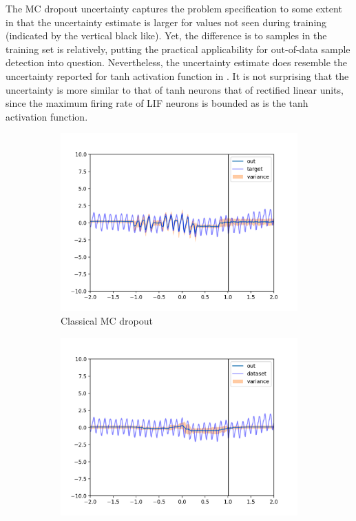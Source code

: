 \documentclass[10pt,a4paper,twocolumn]{article}
\begin{document}
The MC dropout uncertainty captures the problem specification to some extent in that the uncertainty estimate is larger for values not seen during training (indicated by the vertical black like). Yet, the difference is to samples in the training set is relatively, putting the practical applicability for out-of-data sample detection into question. Nevertheless, the uncertainty estimate does resemble the uncertainty reported for tanh activation function in \cite{gal2016uncertainty}. It is not surprising that the uncertainty is more similar to that of tanh neurons that of rectified linear units, since the maximum firing rate of LIF neurons is bounded as is the tanh activation function. 


\begin{figure}[t]
\centering
\begin{subfigure}[t]{0.45\textwidth}
\centering
\includegraphics[width=\linewidth]{gal_co2_report.png}
\caption{Classical MC dropout}\label{subfig:exp2_mc}
\end{subfigure}
\begin{subfigure}[t]{0.45\textwidth}
\centering
\includegraphics[width=\linewidth]{spike_co2_report.png}

\end{subfigure}
\end{figure}
\end{document}
